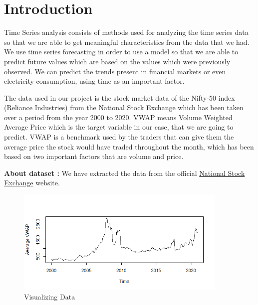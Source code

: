 \documentclass{article}
\begin{document}
\newpage
\tableofcontents
\newpage 
\section{Introduction}
Time Series analysis consists of methods used for analyzing the time series data so that we are able to get meaningful characteristics from the data that we had. We use time series forecasting in order to use a model so that we are able to predict future values which are based on the values which were previously observed. We can predict the trends present in financial markets or even electricity consumption, using time as an important factor.

The data used in our project is the stock market data of the Nifty-50 index (Reliance Industries) from the National Stock Exchange which has been taken over a period from the year 2000 to 2020.
VWAP means Volume Weighted Average Price which is the target variable in our case, that we are going to predict.
VWAP is a benchmark used by the traders that can give them the average price the stock would have traded throughout the month, which has been based on two important factors that are volume and price.


\textbf{About dataset :}
We have extracted the data from the official \href{https://www.nseindia.com}{National Stock Exchange} website.


\begin{figure}[h]
    \centering
    \includegraphics[width=0.9\textwidth]{Intro_plot_1.png}
    \caption{Visualizing Data}
    \label{fig:Label1}
\end{figure}
\end{document}
